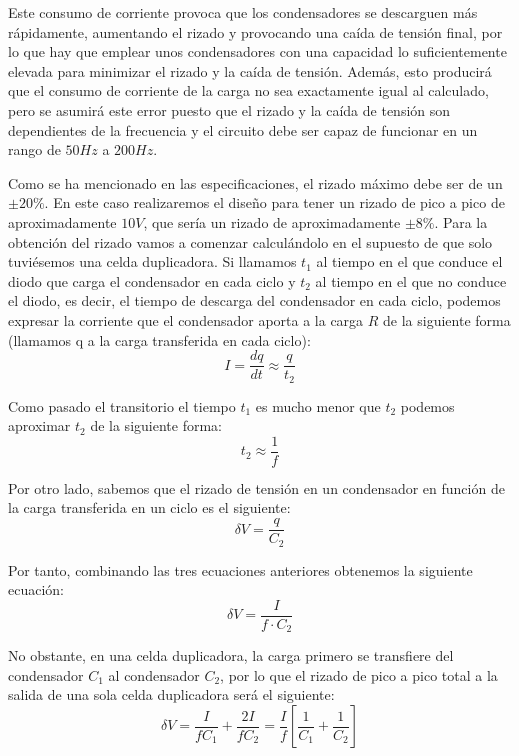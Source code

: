 Este consumo de corriente provoca que los condensadores se descarguen más rápidamente, aumentando 
el rizado y provocando una caída de tensión final, por lo que hay que emplear unos condensadores con 
una capacidad lo suficientemente elevada para minimizar el rizado y la caída de tensión. Además, esto producirá que el consumo de corriente
de la carga no sea exactamente igual al calculado, pero se asumirá este error puesto que el rizado y la caída de tensión son dependientes de la frecuencia
y el circuito debe ser capaz de funcionar en un rango de $50Hz$ a $200Hz$.

Como se ha mencionado en las especificaciones, el rizado máximo debe ser de un $\pm20\%$. En este caso 
realizaremos el diseño para tener un rizado de pico a pico de aproximadamente $10V$, que sería un 
rizado de aproximadamente $\pm8\%$. Para la obtención del rizado vamos a comenzar calculándolo 
en el supuesto de que solo tuviésemos una celda duplicadora. Si llamamos $t_1$ al tiempo en el que conduce el diodo que carga 
el condensador en cada ciclo y $t_2$ al tiempo en el que no conduce el diodo, es decir, el tiempo de descarga 
del condensador en cada ciclo, podemos expresar la corriente que el condensador aporta a la carga $R$ de la siguiente forma (llamamos 
q a la carga transferida en cada ciclo):
\begin{equation}
    I = \frac{dq}{dt} \approx \frac{q}{t_2}
\end{equation}

Como pasado el transitorio el tiempo $t_1$ es mucho menor que $t_2$ podemos aproximar 
$t_2$ de la siguiente forma:
\begin{equation}
    t_2 \approx \frac{1}{f}
\end{equation}

Por otro lado, sabemos que el rizado de tensión en un condensador en función de la carga transferida 
en un ciclo es el siguiente:
\begin{equation}
    \delta V = \frac{q}{C_2}
\end{equation}

Por tanto, combinando las tres ecuaciones anteriores obtenemos la siguiente ecuación:
\begin{equation}
    \delta V = \frac{I}{f\cdot C_2}
\end{equation}

No obstante, en una celda duplicadora, la carga primero se transfiere del condensador $C_1$ al condensador 
$C_2$, por lo que el rizado de pico a pico total a la salida de una sola celda duplicadora será el siguiente:
\begin{equation}
    \delta V = \frac{I}{fC_1}+\frac{2I}{fC_2} = \frac{I}{f}\left[\frac{1}{C_1}+\frac{1}{C_2}\right]
\end{equation}

